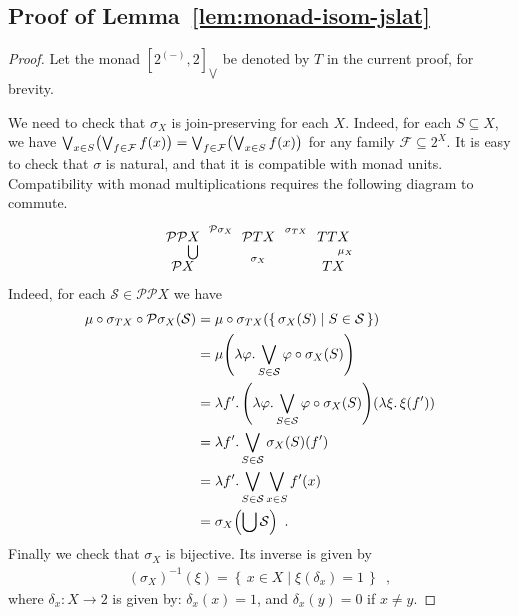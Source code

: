 \documentclass[9pt, preprint]{sigplanconf}
\theoremstyle{theorem}
\theoremstyle{definition}
\newcommand{\calF}{\mathcal{F}}
\newcommand{\calS}{\mathcal{S}}
\renewcommand{\phi}{\varphi}
\newcommand{\pow}{\mathcal{P}}
\newcommand{\set}[2]{\left\{\, #1 \mathrel{}\middle|\mathrel{} #2 \,\right\}}
\newcommand{\place}{{-}}
\newcommand{\biglor}{\bigvee}
\DeclarePairedDelimiter\p{(}{)}
\renewcommand{\subset}{\subseteq}
\begin{document}
\subsection{Proof of Lemma~\ref{lem:monad-isom-jslat}}
\begin{proof}
  Let the monad $[2^{(\place)}, 2]_{\biglor}$ be denoted by $T$ in the
  current proof, for brevity.

We need to check that  $\sigma_X$ is join-preserving for each
 $X$. Indeed, for each $S\subseteq X$, we have
  $\bigvee_{x \in S} \p[\big]{\bigvee_{f \in \calF} f(x)}
  = \bigvee_{f \in \calF} \p[\big]{\bigvee_{x \in S} f(x)}$
  for any family $\calF \subset 2^X$.
It is easy to check that $\sigma$ is natural, and that it is
 compatible with monad units.
Compatibility with monad multiplications requires the following diagram
 to commute.
  \begin{align*}
    \xymatrix@R=.8em{
      \pow \pow X \ar[r]^{\pow \sigma_X} \ar[d]^{\bigcup}
      & \pow T X \ar[r]^{\sigma_{T X}}
      & T T X \ar[d]^{\mu_X} \\
      \pow X \ar[rr]^{\sigma_X}
      && T X
    }
  \end{align*}
 Indeed, for each  $\calS \in \pow \pow X$ we have
  \begin{align*}
    \mu \circ \sigma_{T X} \circ \pow \sigma_X (\calS)
    &= \mu \circ \sigma_{T X} \p*{\set{\sigma_X (S)}{S \in \calS}} \\
    &= \mu \p*{\lambda \phi \ldotp
      \biglor_{S \in \calS} \phi \circ \sigma_X (S)} \\
    &= \lambda f' \ldotp \p*{\lambda \phi \ldotp
      \biglor_{S \in \calS} \phi \circ \sigma_X (S)} \p*{\lambda \xi \ldotp \xi(f')} \\
      &= \lambda f' \ldotp \biglor_{S \in \calS} \sigma_X (S)(f') \\
    &= \lambda f' \ldotp \biglor_{S \in \calS} \biglor_{x \in S} f'(x) \\
    &= \sigma_X \p*{\bigcup \calS} \enspace .
  \end{align*}
  Finally we check that
$\sigma_{X}$ is bijective. Its inverse is  given by
  \begin{align*}
    (\sigma_X)^{-1}(\xi) = \set{x \in X}{\xi(\delta_x) = 1}\enspace,
  \end{align*}
  where $\delta_{x}\colon X\to 2$ is given by: $\delta_x(x) = 1$, and $\delta_x(y) = 0$ if $x \neq y$.
\end{proof}
\end{document}
